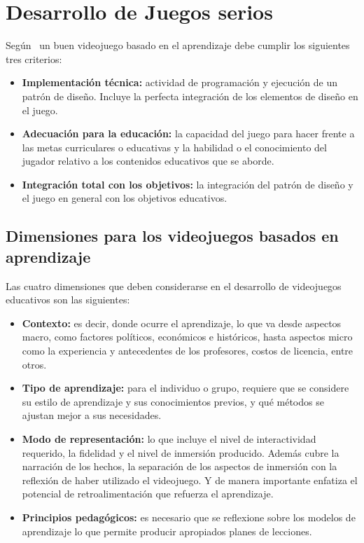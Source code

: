 \section{Desarrollo de Juegos serios}
\label{sec:desarrollo}

Según~\cite{education:games} un buen videojuego basado en el aprendizaje debe
cumplir  los siguientes tres criterios:

\begin{itemize}
\item \textbf{Implementación técnica:} actividad de programación y ejecución de
    un patrón de diseño. Incluye la perfecta integración de los elementos de
    diseño en el juego.
\item \textbf{Adecuación para la educación:} la capacidad del juego para hacer
    frente a las metas curriculares o educativas y la habilidad o el
    conocimiento del jugador relativo a los contenidos educativos que se aborde.
\item \textbf{Integración total con los objetivos:} la integración del patrón de
    diseño y el juego en general con los objetivos educativos.
\end{itemize}



\subsection{Dimensiones para los videojuegos basados en aprendizaje}

Las cuatro dimensiones que deben considerarse en el desarrollo de videojuegos
educativos son las  siguientes\cite{education:games}:

\begin{itemize}
\item \textbf{Contexto:} es decir, donde ocurre el aprendizaje, lo que va desde
    aspectos macro, como  factores políticos, económicos e históricos, hasta
    aspectos micro como la experiencia y  antecedentes de los profesores, costos
    de licencia, entre otros.
\item \textbf{Tipo de aprendizaje:} para el individuo o grupo, requiere que se
    considere su  estilo de aprendizaje y sus conocimientos previos, y qué
    métodos se ajustan mejor a sus  necesidades.
\item \textbf{Modo de representación:} lo que incluye el nivel de interactividad
    requerido, la fidelidad y  el nivel de inmersión producido. Además cubre la
    narración de los hechos, la separación de los  aspectos de inmersión con la
    reflexión de haber utilizado el videojuego. Y de manera importante  enfatiza
    el potencial de retroalimentación que refuerza el aprendizaje.
\item \textbf{Principios pedagógicos:} es necesario que se reflexione sobre los
    modelos de aprendizaje lo  que permite producir apropiados planes de
    lecciones.
\end{itemize}

